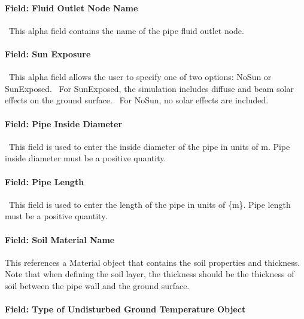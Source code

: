 \paragraph{Field: Fluid Outlet Node Name}\label{field-fluid-outlet-node-name-2}

~This alpha field contains the name of the pipe fluid outlet node.

\paragraph{Field: Sun Exposure}\label{field-sun-exposure}

~This alpha field allows the user to specify one of two options: NoSun or SunExposed.~ For SunExposed, the simulation includes diffuse and beam solar effects on the ground surface.~ For NoSun, no solar effects are included.

\paragraph{Field: Pipe Inside Diameter}\label{field-pipe-inside-diameter-2}

~This field is used to enter the inside diameter of the pipe in units of m. Pipe inside diameter must be a positive quantity.

\paragraph{Field: Pipe Length}\label{field-pipe-length-2}

~This field is used to enter the length of the pipe in units of \{m\}. Pipe length must be a positive quantity.

\paragraph{Field: Soil Material Name}\label{field-soil-material-name}

This references a Material object that contains the soil properties and thickness.~ Note that when defining the soil layer, the thickness should be the thickness of soil between the pipe wall and the ground surface.

\paragraph{Field: Type of Undisturbed Ground Temperature Object}\label{field-type-of-undisturbed-ground-temperature-object-001}

